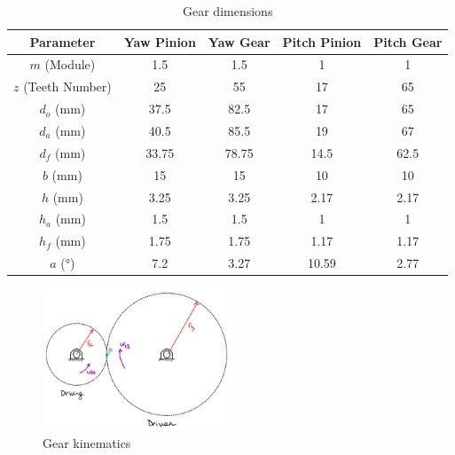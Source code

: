 \documentclass[12pt]{report}
\begin{document}
\begin{table}[H]
\centering
\caption{Gear dimensions}
\begin{tabular}{|c|c|c|c|c|}
\hline
\textbf{Parameter} & \textbf{Yaw Pinion} & \textbf{Yaw Gear} & \textbf{Pitch Pinion} & \textbf{Pitch Gear} \\ \hline
$m$ (Module)       & 1.5                 & 1.5               & 1                     & 1                   \\ \hline
$z$ (Teeth Number) & 25                  & 55                & 17                    & 65                  \\ \hline
$d_o$ (mm)         & 37.5                & 82.5              & 17                    & 65                  \\ \hline
$d_a$ (mm)         & 40.5                & 85.5              & 19                    & 67                  \\ \hline
$d_f$ (mm)         & 33.75               & 78.75             & 14.5                  & 62.5                \\ \hline
$b$ (mm)           & 15                  & 15                & 10                    & 10                  \\ \hline
$h$ (mm)           & 3.25                & 3.25              & 2.17                  & 2.17                \\ \hline
$h_a$ (mm)         & 1.5                 & 1.5               & 1                     & 1                   \\ \hline
$h_f$ (mm)         & 1.75                & 1.75              & 1.17                  & 1.17                \\ \hline
$a$ (°)            & 7.2                 & 3.27              & 10.59                 & 2.77                \\ \hline
\end{tabular}
\label{table:gear_dimensions}
\end{table}

\begin{figure}[h!]
    \centering
    \includegraphics[width=0.5\textwidth]{fig12 gear kin.png} 
    \caption{Gear kinematics} 
    \label{Gear Kinematics} 
\end{figure}
\end{document}
